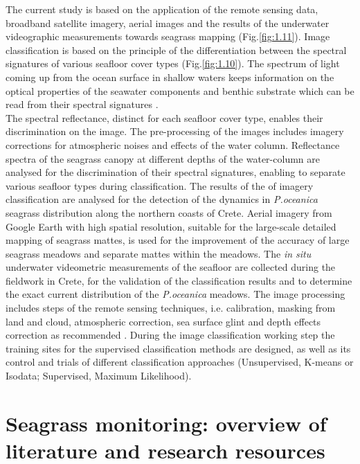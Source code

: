 \documentclass[11pt]{article}
\begin{document}
The current study is based on the application of the remote sensing data, broadband satellite imagery,
aerial images and the results of the underwater videographic measurements towards seagrass
mapping  (Fig.\ref{fig:1.11}). Image classification is based on the principle of the differentiation between the spectral
signatures of various seafloor cover types  (Fig.\ref{fig:1.10}). The spectrum of light coming up from the ocean surface in
shallow waters keeps information on the optical properties of the seawater components and benthic
substrate which can be read from their spectral signatures \cite{Werdell03}\label{Werdell03}. \\
The spectral reflectance, distinct for each seafloor cover type, enables their discrimination on the image. The pre-processing
of the images includes imagery corrections for atmospheric noises and effects of the water
column. Reflectance spectra of the seagrass canopy at different depths of the water-column are
analysed for the discrimination of their spectral signatures, enabling to separate various seafloor types
during classification. The results of the of imagery classification are analysed for the detection of the
dynamics in \textit{P.oceanica} seagrass distribution along the northern coasts of Crete. Aerial imagery from
Google Earth with high spatial resolution, suitable for the large-scale detailed mapping of seagrass
mattes, is used for the improvement of the accuracy of large seagrass meadows and separate mattes
within the meadows. The \textit{in situ} underwater videometric measurements of the seafloor are collected
during the fieldwork in Crete, for the validation of the classification results and to determine the exact
current distribution of the \textit{P.oceanica} meadows. The image processing includes steps of the remote
sensing techniques, i.e. calibration, masking from land and cloud, atmospheric correction, sea surface
glint and depth effects correction as recommended \cite{Matarrese08}\label{Matarrese08}. During the image classification
working step the training sites for the supervised classification methods are designed, as well as its
control and trials of different classification approaches (Unsupervised, K-means or Isodata;
Supervised, Maximum Likelihood).

\section[Overview of literature]{Seagrass monitoring: overview of literature and research resources} \label{sec:2}
\renewcommand{\headrulewidth}{0.4pt}
\end{document}
